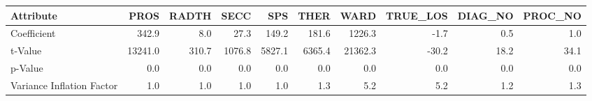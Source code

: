 \begin{tabular}{lrrrrrrrrr}
\toprule
Attribute &     PROS &  RADTH &    SECC &     SPS &    THER &     WARD &  TRUE\_LOS &  DIAG\_NO &  PROC\_NO \\
\midrule
Coefficient               &    342.9 &    8.0 &    27.3 &   149.2 &   181.6 &   1226.3 &      -1.7 &      0.5 &      1.0 \\
t-Value                   &  13241.0 &  310.7 &  1076.8 &  5827.1 &  6365.4 &  21362.3 &     -30.2 &     18.2 &     34.1 \\
p-Value                   &      0.0 &    0.0 &     0.0 &     0.0 &     0.0 &      0.0 &       0.0 &      0.0 &      0.0 \\
Variance Inflation Factor &      1.0 &    1.0 &     1.0 &     1.0 &     1.3 &      5.2 &       5.2 &      1.2 &      1.3 \\
\bottomrule
\end{tabular}
